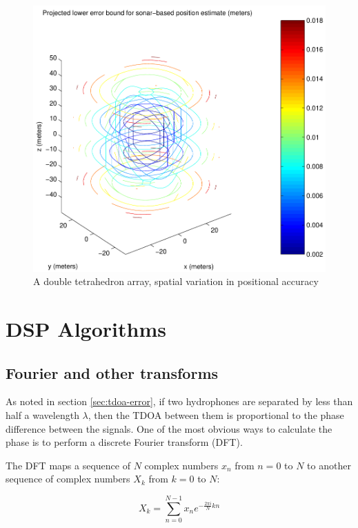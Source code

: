 \documentclass[10pt]{article}
\begin{document}
\begin{figure}[htbp]
\begin{center}
\includegraphics[scale=0.5]{doubleTetrahedron.pdf}
\caption{A double tetrahedron array, spatial variation in positional accuracy}
\label{fig:doubleTetrahedron}
\end{center}
\end{figure}

\section{DSP Algorithms}

\subsection{Fourier and other transforms}

As noted in section \ref{sec:tdoa-error}, if two hydrophones are separated by less than half a  wavelength \(\lambda\), then the TDOA between them is proportional to the phase difference between the signals.  One of the most obvious ways to calculate the phase is to perform a discrete Fourier transform (DFT).

The DFT maps a sequence of \(N\) complex numbers \(x_n\) from \(n=0\) to \(N\) to another sequence of complex numbers \(X_k\) from \(k=0\) to \(N\):

\begin{equation}
X_k=\sum_{n=0}^{N-1} {x_n e^{- \frac{2 \pi i}{N} kn}}
\end{equation}
\end{document}
